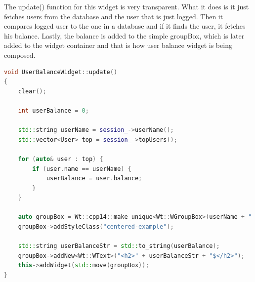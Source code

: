 \documentclass[a4paper,12pt]{book}
\begin{document}
{{The update() function for this widget is very transparent. What it does is it just fetches users from the database and the user that is just logged. Then it compares logged user to the one in a database and if it finds the user, it fetches his balance. Lastly, the balance is added to the simple groupBox, which is later added to the widget container and that is how user balance widget is being composed.

\bigskip
\begin{lstlisting}[frame=single, basicstyle=\small, language=C++, caption={UserBalanceWidget::update() function.}, captionpos=b]
void UserBalanceWidget::update()
{
	clear();

	int userBalance = 0;

	std::string userName = session_->userName();
	std::vector<User> top = session_->topUsers();

	for (auto& user : top) {
		if (user.name == userName) {
			userBalance = user.balance;
		}
	}

	auto groupBox = Wt::cpp14::make_unique<Wt::WGroupBox>(userName + " balance");
	groupBox->addStyleClass("centered-example");

	std::string userBalanceStr = std::to_string(userBalance);
	groupBox->addNew<Wt::WText>("<h2>" + userBalanceStr + "$</h2>");
	this->addWidget(std::move(groupBox));
}
\end{lstlisting}
}

}
\end{document}
